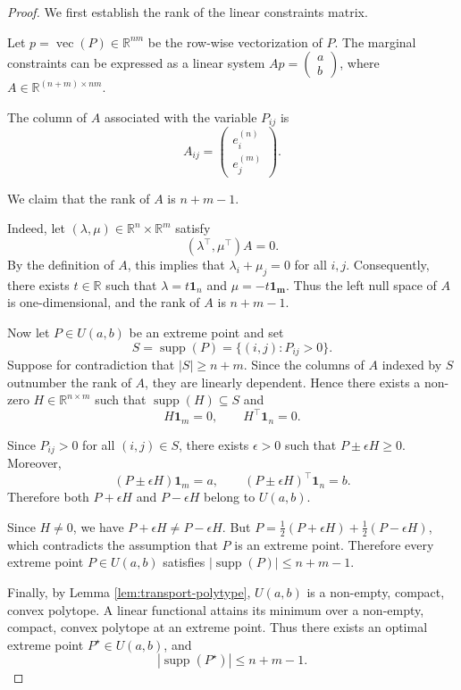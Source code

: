 \documentclass[11pt,a4paper]{article}
\theoremstyle{definition}
\begin{document}
\begin{proof}
    We first establish the rank of the linear constraints matrix.

    Let $p=\operatorname{vec}(P)\in\mathbb{R}^{nm}$ be the row-wise vectorization
    of $P$. The marginal constraints can be expressed as a linear system
    $Ap = \begin{pmatrix} a \\ b \end{pmatrix}$, where $A\in\mathbb{R}^{(n+m)\times nm}$.

    The column of $A$ associated with the variable $P_{ij}$ is
    \[ A_{ij} = \begin{pmatrix} e_i^{(n)} \\ e_j^{(m)} \end{pmatrix}.\]

    We claim that the rank of $A$ is $n+m-1$.

    Indeed, let $(\lambda, \mu)\in\mathbb{R}^n\times\mathbb{R}^m$ satisfy
    \[(\lambda^\top, \mu^\top)A = 0.\]
    By the definition of $A$, this implies that $\lambda_i + \mu_j = 0$ for all $i,j$.
    Consequently, there exists $t\in\mathbb{R}$ such that $\lambda = t\mathbf{1}_n$
    and $\mu = -t\mathbf{1_m}$. Thus the left null space of $A$ is one-dimensional,
    and the rank of $A$ is $n+m-1$.

    Now let $P\in U(a,b)$ be an extreme point and set
    \[S=\operatorname{supp}(P)=\{(i,j):P_{ij}>0\}.\]
    Suppose for contradiction that $|S|\geq n+m$.
    Since the columns of $A$ indexed by $S$ outnumber the rank of $A$,
    they are linearly dependent. Hence there exists a non-zero $H\in\mathbb{R}^{n\times m}$
    such that $\operatorname{supp}(H)\subseteq S$ and
    \[H\mathbf{1}_m=0,\qquad H^\top\mathbf{1}_n=0.\]

    Since $P_{ij}>0$ for all $(i,j)\in S$, there exists $\epsilon>0$ such that
    $P\pm\epsilon H\geq 0.$ Moreover,
    \[ (P\pm\epsilon H)\mathbf{1}_m = a, \qquad (P\pm\epsilon H)^\top\mathbf{1}_n = b.\]
    Therefore both $P+\epsilon H$ and $P-\epsilon H$ belong to $U(a,b)$.

    Since $H\neq 0$, we have $P+\epsilon H\neq P-\epsilon H$.
    But $P = \frac{1}{2}(P+\epsilon H) + \frac{1}{2}(P-\epsilon H)$,
    which contradicts the assumption that $P$ is an extreme point.
    Therefore every extreme point $P\in U(a,b)$ satisfies
    $|\operatorname{supp}(P)|\leq n+m-1$.

    Finally, by Lemma \ref{lem:transport-polytype}, $U(a,b)$ is a non-empty, compact, convex polytope.
    A linear functional attains its minimum over a non-empty, compact, convex polytope at an extreme point.
    Thus there exists an optimal extreme point $P^\star\in U(a,b)$, and
    \[|\operatorname{supp}(P^\star)|\leq n+m-1.\]
\end{proof}
\end{document}
